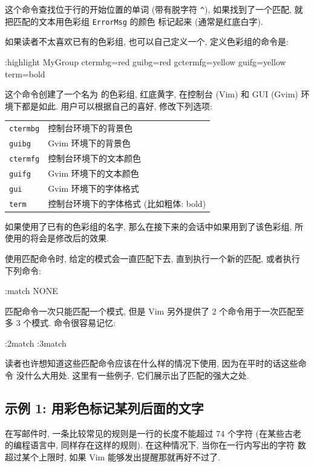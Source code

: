 这个命令查找位于行的开始位置的单词  (带有脱字符 \texttt{\^}),
如果找到了一个匹配, 就把匹配的文本用色彩组 \texttt{ErrorMsg} 的颜色
标记起来 (通常是红底白字).

如果读者不太喜欢已有的色彩组, 也可以自己定义一个, 定义色彩组的命令是:
\begin{vimcmd}
:highlight MyGroup ctermbg=red guibg=red gctermfg=yellow
        guifg=yellow term=bold
\end{vimcmd}
这个命令创建了一个名为  的色彩组, 红底黄字, 在控制台 (Vim)
和 GUI (Gvim) 环境下都是如此. 用户可以根据自己的喜好, 修改下列选项:

\begin{center}
\begin{tabular}{ll}
    \hline
    \texttt{ctermbg}    & 控制台环境下的背景色 \\
    \texttt{guibg}      & Gvim 环境下的背景色 \\
    \texttt{ctermfg}     & 控制台环境下的文本颜色 \\
    \texttt{guifg}      & Gvim 环境下的文本颜色 \\
    \texttt{gui}        & Gvim 环境下的字体格式 \\
    \texttt{term}       & 控制台环境下的字体格式 (比如粗体: bold) \\
    \hline
\end{tabular}
\end{center}

如果使用了已有的色彩组的名字, 那么在接下来的会话中如果用到了该色彩组,
所使用的将会是修改后的效果.

使用匹配命令时, 给定的模式会一直匹配下去, 直到执行一个新的匹配, 或者执行
下列命令:
\begin{vimcmd}
:match NONE
\end{vimcmd}
匹配命令一次只能匹配一个模式, 但是 Vim 另外提供了 2 个命令用于一次匹配至
多 3 个模式. 命令很容易记忆:
\begin{vimcmd}
:2match
:3match
\end{vimcmd}
读者也许想知道这些匹配命令应该在什么样的情况下使用, 因为在平时的话这些命令
没什么大用处. 这里有一些例子, 它们展示出了匹配的强大之处.

\subsection{示例 1: 用彩色标记某列后面的文字}
\label{subsec:mark_color_characters_after_a_certain}
在写邮件时, 一条比较常见的规则是一行的长度不能超过 74 个字符 (在某些古老
的编程语言中, 同样存在这样的规则). 在这种情况下, 当你在一行内写出的字符
数超过某个上限时, 如果 Vim 能够发出提醒那就再好不过了.

